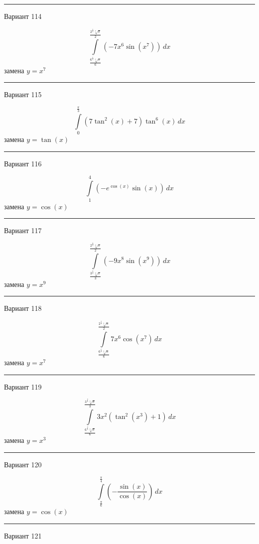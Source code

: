 \documentclass[11pt]{report}
\begin{document}
\rule{\textwidth}{.2mm}

Вариант 114

$$\int\limits_{\frac{6^{\frac{6}{7}} \sqrt[7]{\pi}}{6}}^{\frac{2^{\frac{5}{7}} \sqrt[7]{\pi}}{2}} \left(- 7 x^{6} \sin{\left(x^{7} \right)}\right)\, dx$$
замена $y = x^{7}$



\rule{\textwidth}{.2mm}

Вариант 115

$$\int\limits_{0}^{\frac{\pi}{3}} \left(7 \tan^{2}{\left(x \right)} + 7\right) \tan^{6}{\left(x \right)}\, dx$$
замена $y = \tan{\left(x \right)}$



\rule{\textwidth}{.2mm}

Вариант 116

$$\int\limits_{1}^{4} \left(- e^{\cos{\left(x \right)}} \sin{\left(x \right)}\right)\, dx$$
замена $y = \cos{\left(x \right)}$



\rule{\textwidth}{.2mm}

Вариант 117

$$\int\limits_{\frac{3^{\frac{8}{9}} \sqrt[9]{\pi}}{3}}^{\frac{2^{\frac{8}{9}} \sqrt[9]{\pi}}{2}} \left(- 9 x^{8} \sin{\left(x^{9} \right)}\right)\, dx$$
замена $y = x^{9}$



\rule{\textwidth}{.2mm}

Вариант 118

$$\int\limits_{\frac{6^{\frac{6}{7}} \sqrt[7]{\pi}}{6}}^{\frac{2^{\frac{5}{7}} \sqrt[7]{\pi}}{2}} 7 x^{6} \cos{\left(x^{7} \right)}\, dx$$
замена $y = x^{7}$



\rule{\textwidth}{.2mm}

Вариант 119

$$\int\limits_{\frac{6^{\frac{2}{3}} \sqrt[3]{\pi}}{6}}^{\frac{3^{\frac{2}{3}} \sqrt[3]{\pi}}{3}} 3 x^{2} \left(\tan^{2}{\left(x^{3} \right)} + 1\right)\, dx$$
замена $y = x^{3}$



\rule{\textwidth}{.2mm}

Вариант 120

$$\int\limits_{\frac{\pi}{6}}^{\frac{\pi}{4}} \left(- \frac{\sin{\left(x \right)}}{\cos{\left(x \right)}}\right)\, dx$$
замена $y = \cos{\left(x \right)}$



\rule{\textwidth}{.2mm}

Вариант 121
\end{document}

